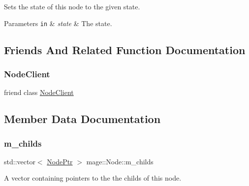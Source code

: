 Sets the state of this node to the given state.


\begin{DoxyParams}[1]{Parameters}
\mbox{\tt in}  & {\em state} & The state. \\
\hline
\end{DoxyParams}


\subsection{Friends And Related Function Documentation}
\hypertarget{classmage_1_1_node_a6e6c0f9acf9f770577b16be7a41ae51e}{}\label{classmage_1_1_node_a6e6c0f9acf9f770577b16be7a41ae51e} 
\subsubsection{\texorpdfstring{Node\+Client}{NodeClient}}
{\footnotesize\ttfamily friend class \hyperlink{classmage_1_1_node_client}{Node\+Client}\hspace{0.3cm}{\ttfamily [friend]}}



\subsection{Member Data Documentation}
\hypertarget{classmage_1_1_node_a1d1d432f46c61932b5167d27d20cc383}{}\label{classmage_1_1_node_a1d1d432f46c61932b5167d27d20cc383} 
\subsubsection{\texorpdfstring{m\+\_\+childs}{m\_childs}}
{\footnotesize\ttfamily std\+::vector$<$ \hyperlink{classmage_1_1_node_ac575dc006e0ae1134277ade977dc06b6}{Node\+Ptr} $>$ mage\+::\+Node\+::m\+\_\+childs\hspace{0.3cm}{\ttfamily [private]}}

A vector containing pointers to the the childs of this node. \hypertarget{classmage_1_1_node_a804d53398f193b6b06f883131ab7415d}{}\label{classmage_1_1_node_a804d53398f193b6b06f883131ab7415d} 
